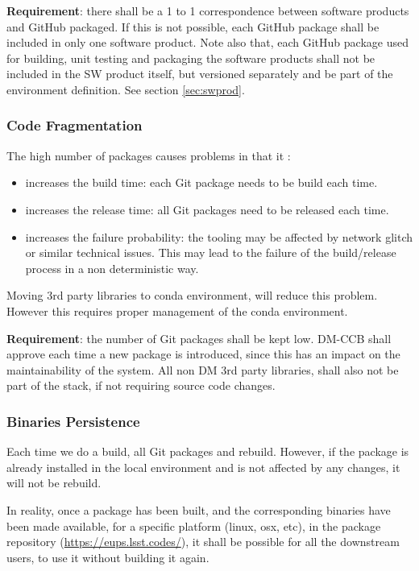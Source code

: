 \textbf{Requirement}: there shall be a 1 to 1 correspondence between software products and GitHub packaged. If this is not possible, each GitHub package shall be included in only one software product.
Note also that, each GitHub package used for building, unit testing and packaging the software products shall not be included in the SW product itself, but versioned separately and be part of the environment definition. See section \ref{sec:swprod}.


\subsubsection{Code Fragmentation} \label{sec:problemCode}

The high number of packages causes problems in that it :

\begin{itemize}
\item increases the build time: each Git package needs to be build each time.
\item increases the release time: all Git packages need to be released each time.
\item increases the failure probability: the tooling may be affected by network glitch or similar technical issues. This may lead to the failure of the build/release process in a non deterministic way.
\end{itemize}

Moving 3rd party libraries to conda environment, will reduce this problem. 
However this requires proper management of the conda environment.

\textbf{Requirement}: the number of Git packages shall be kept low. DM-CCB shall approve each time a new package is introduced, since this has an impact on the maintainability of the system. 
All non DM 3rd party libraries, shall also not be part of the stack, if not requiring source code changes.


\subsubsection{Binaries Persistence} \label{sec:problemPersistence}

Each time we do a build, all Git packages and rebuild. However, if the package is already installed in the local environment and is not affected by any changes, it will not be rebuild.

In reality, once a package has been built, and the corresponding binaries have been made available, for a specific platform (linux, osx, etc), in the package repository (\url{https://eups.lsst.codes/}),
it shall be possible for all the downstream users, to use it without building it again.

